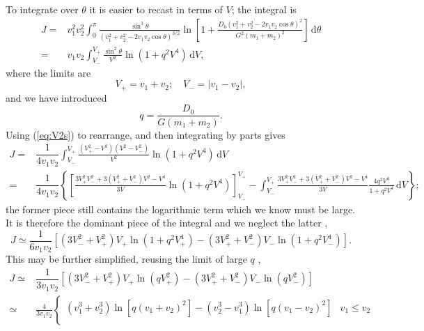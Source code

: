 \documentclass[useAMS,usedcolumn,usegraphicx,usenatbib]{mn2e}
\newcommand{\eqnref}[1]{(\ref{eq:#1})}
\newcommand{\dd}{\ensuremath{\mathrm{d}}}
\newcommand{\intd}[4]{\ensuremath{\displaystyle \int_{#1}^{#2}{#3}\,\dd{#4}}}
\newcommand{\recip}[1]{\ensuremath{\dfrac{1}{#1}}}
\begin{document}
\begin{onecolumn}
To integrate over $\theta$ it is easier to recast in terms of $V$; the integral is
\begin{align}
J = {} & v_1^2 v_2^2 \intd{0}{\pi}{\frac{\sin^3\theta}{\left(v_1^2 + v_2^2 - 2v_1 v_2 \cos\theta\right)^{3/2}}\ln\left[1 + \frac{D_0\left(v_1^2 + v_2^2 - 2v_1 v_2 \cos\theta\right)^2}{G^2\left(m_1 + m_2\right)^2}\right]}{\theta} \\
 = {} & v_1 v_2 \intd{V_-}{V_+}{\frac{\sin^2\theta}{V^2}\ln\left(1 + q^2V^4\right)}{V},
\end{align}
where the limits are
\begin{equation}
V_+ = v_1 + v_2; \quad V_- = |v_1 - v_2|,
\end{equation}
and we have introduced
\begin{equation}
q = \frac{D_0}{G\left(m_1+m_2\right)}.
\end{equation}
Using \eqnref{V2s} to rearrange, and then integrating by parts gives
\begin{align}
J = {} & \recip{4 v_1 v_2} \intd{V_-}{V_+}{\frac{\left(V_+^2 - V^2\right)\left(V^2 - V_-^2\right)}{V^2}\ln\left(1 + q^2V^4\right)}{V} \\
 = {} & \recip{4 v_1 v_2} \left\{\left[\frac{3V_+^2V_-^2 + 3\left(V_+^2 + V_-^2\right)V^2 - V^4}{3V} \ln\left(1 + q^2V^4\right)\right]^{V_+}_{V_-} - \intd{V_-}{V_+}{\frac{3V_+^2V_-^2 + 3\left(V_+^2 + V_-^2\right)V^2 - V^4}{3V}\frac{4q^2V^3}{1+ q^2V^4}}{V}\right\};
\end{align}
the former piece still contains the logarithmic term which we know must be large. It is therefore the dominant piece of the integral and we neglect the latter \citep{Chandrasekhar1941},
\begin{equation}
J \simeq \recip{6 v_1 v_2} \left[\left(3V_-^2 + V_+^2\right)V_+\ln\left(1 + q^2V_+^4\right) - \left(3V_+^2 + V_-^2\right)V_-\ln\left(1 + q^2V_-^4\right)\right].
\end{equation}
This may be further simplified, reusing the limit of large $q$ \citep{Chandrasekhar1941,Chandrasekhar1941b},
\begin{align}
J \simeq {} & \recip{3 v_1 v_2} \left[\left(3V_-^2 + V_+^2\right)V_+\ln\left(qV_+^2\right) - \left(3V_+^2 + V_-^2\right)V_-\ln\left(qV_-^2\right)\right] \\
 \simeq {} & \frac{4}{3v_1v_2}\begin{cases}
\left(v_1^3 + v_2^3\right)\ln\left[q\left(v_1 + v_2\right)^2\right] - \left(v_2^3 - v_1^3\right)\ln\left[q\left(v_1 - v_2\right)^2\right] & v_1 \leq v_2 \\

\end{cases}
\end{align}
\end{onecolumn}
\end{document}
